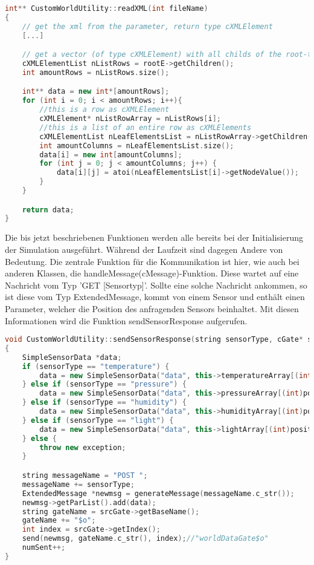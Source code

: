 \begin{lstlisting}[language=C++]
int** CustomWorldUtility::readXML(int fileName)
{
    // get the xml from the parameter, return type cXMLElement
    [...]

    // get a vector (of type cXMLElement) with all childs of the root-tag
    cXMLElementList nListRows = rootE->getChildren();
    int amountRows = nListRows.size();

    int** data = new int*[amountRows];
    for (int i = 0; i < amountRows; i++){
        //this is a row as cXMLElement
        cXMLElement* nListRowArray = nListRows[i];
        //this is a list of an entire row as cXMLElements
        cXMLElementList nLeafElementsList = nListRowArray->getChildren();
        int amountColumns = nLeafElementsList.size();
        data[i] = new int[amountColumns];
        for (int j = 0; j < amountColumns; j++) {
            data[i][j] = atoi(nLeafElementsList[i]->getNodeValue());
        }
    }

    return data;
}
\end{lstlisting}

Die bis jetzt beschriebenen Funktionen werden alle bereits bei der Initialisierung der Simulation ausgeführt. Während der Laufzeit sind dagegen Andere von Bedeutung. Die zentrale Funktion für die Kommunikation ist hier, wie auch bei anderen Klassen, die handleMessage(cMessage)-Funktion. \newline
Diese wartet auf eine Nachricht vom Typ 'GET [Sensortyp]'. Sollte eine solche Nachricht ankommen, so ist diese vom Typ ExtendedMessage, kommt von einem Sensor und enthält einen Parameter, welcher die Position des anfragenden Sensors beinhaltet. Mit diesen Informationen wird die Funktion sendSensorResponse aufgerufen.

\begin{lstlisting}[language=C++]
void CustomWorldUtility::sendSensorResponse(string sensorType, cGate* srcGate, SimpleCoord* position)
{
    SimpleSensorData *data;
    if (sensorType == "temperature") {
        data = new SimpleSensorData("data", this->temperatureArray[(int)position->x][(int)position->y]);
    } else if (sensorType == "pressure") {
        data = new SimpleSensorData("data", this->pressureArray[(int)position->x][(int)position->y]);
    } else if (sensorType == "humidity") {
        data = new SimpleSensorData("data", this->humidityArray[(int)position->x][(int)position->y]);
    } else if (sensorType == "light") {
        data = new SimpleSensorData("data", this->lightArray[(int)position->x][(int)position->y]);
    } else {
        throw new exception;
    }

    string messageName = "POST ";
    messageName += sensorType;
    ExtendedMessage *newmsg = generateMessage(messageName.c_str());
    newmsg->getParList().add(data);
    string gateName = srcGate->getBaseName();
    gateName += "$o";
    int index = srcGate->getIndex();
    send(newmsg, gateName.c_str(), index);//"worldDataGate$o"
    numSent++;
}
\end{lstlisting}

